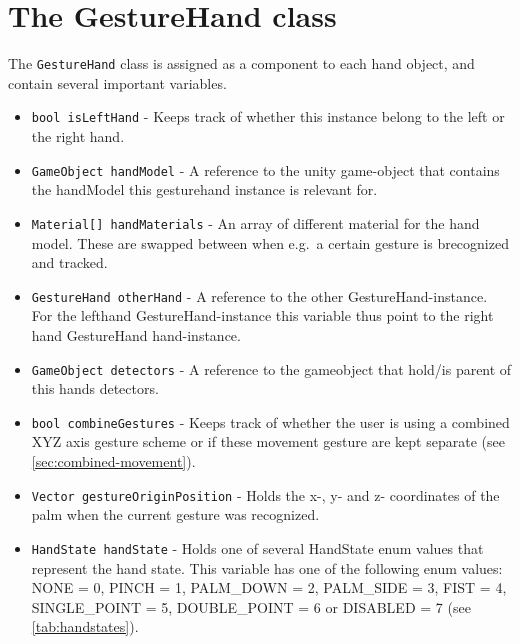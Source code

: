 \section{The GestureHand class}
The \texttt{GestureHand} class is assigned as a component to each hand object, and contain several important variables.
\begin{itemize}
	\item \texttt{bool isLeftHand} - Keeps track of whether this instance belong to the left or the right hand.
	\item \texttt{GameObject handModel} - A reference to the unity game-object that contains the handModel this gesturehand instance is relevant for.
	\item \texttt{Material[] handMaterials} - An array of different material for the hand model. These are swapped between when e.g.~a certain gesture is brecognized and tracked.
	\item \texttt{GestureHand otherHand} - A reference to the other GestureHand-instance. For the lefthand GestureHand-instance this variable thus point to the right hand GestureHand
			hand-instance.
	\item \texttt{GameObject detectors} - A reference to the gameobject that hold/is parent of this hands detectors.
	\item \texttt{bool combineGestures} - Keeps track of whether the user is using a combined XYZ axis gesture scheme or if these movement gesture are kept separate (see \ref{sec:combined-movement}).
	\item \texttt{Vector gestureOriginPosition} - Holds the x-, y- and z- coordinates of the palm when the current gesture was recognized.
	\item \texttt{HandState handState} - Holds one of several HandState enum values that represent the hand state. This variable has one of the following enum values:
			NONE = 0, PINCH = 1, PALM\_DOWN = 2, PALM\_SIDE = 3, FIST = 4, SINGLE\_POINT = 5, DOUBLE\_POINT = 6 or DISABLED = 7 (see \ref{tab:handstates}).  
\end{itemize}

